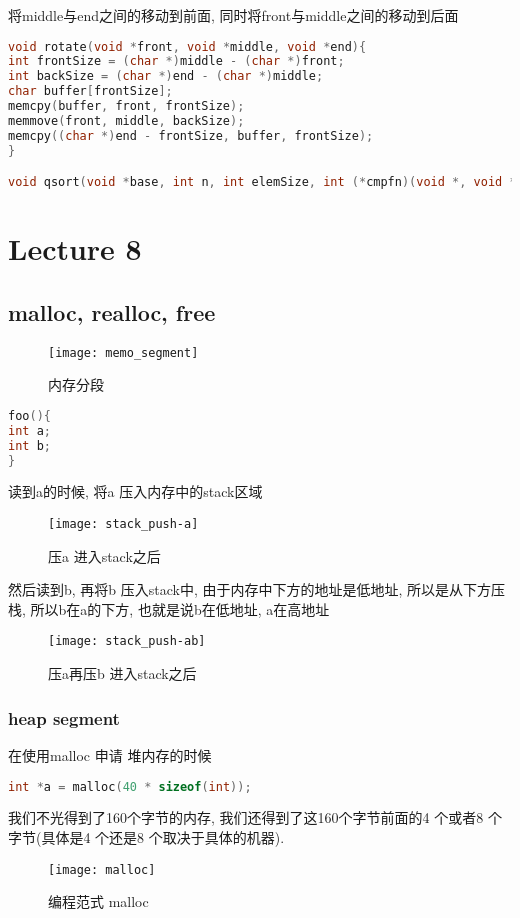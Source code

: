 \documentclass{article}
\begin{document}
将middle与end之间的移动到前面, 同时将front与middle之间的移动到后面
\begin{lstlisting}[language = C]
void rotate(void *front, void *middle, void *end){
int frontSize = (char *)middle - (char *)front;
int backSize = (char *)end - (char *)middle;
char buffer[frontSize];
memcpy(buffer, front, frontSize);
memmove(front, middle, backSize);
memcpy((char *)end - frontSize, buffer, frontSize);
}

void qsort(void *base, int n, int elemSize, int (*cmpfn)(void *, void *))
\end{lstlisting}

\section{Lecture 8}
\subsection{malloc, realloc, free}
\begin{figure}[htbp]
	\centering
	\texttt{[image: memo\_segment]}\\
	\caption{内存分段}\label{fig.memo.segment}
\end{figure}

\begin{lstlisting}[language = C]
foo(){
int a;
int b;
}
\end{lstlisting}
读到a的时候, 将a 压入内存中的stack区域
\begin{figure}[htbp]
	\centering
	\texttt{[image: stack\_push-a]}\\
	\caption{压a 进入stack之后}\label{fig.stack.push.a}
\end{figure}
然后读到b, 再将b 压入stack中, 由于内存中下方的地址是低地址, 所以是从下方压栈, 所以b在a的下方, 也就是说b在低地址, a在高地址
\begin{figure}[htbp]
	\centering
	\texttt{[image: stack\_push-ab]}\\
	\caption{压a再压b 进入stack之后}\label{fig.stack.push.ab}
\end{figure}
 \bigskip
\subsubsection{heap segment}
在使用malloc 申请 堆内存的时候
\begin{lstlisting}[language = C]
int *a = malloc(40 * sizeof(int));
\end{lstlisting}
我们不光得到了160个字节的内存,  我们还得到了这160个字节前面的4 个或者8 个字节(具体是4 个还是8 个取决于具体的机器).
\begin{figure}[htbp]
	\centering
	\texttt{[image: malloc]}\\
	\caption{编程范式 malloc}\label{fig.malloc}
\end{figure}
\end{document}
